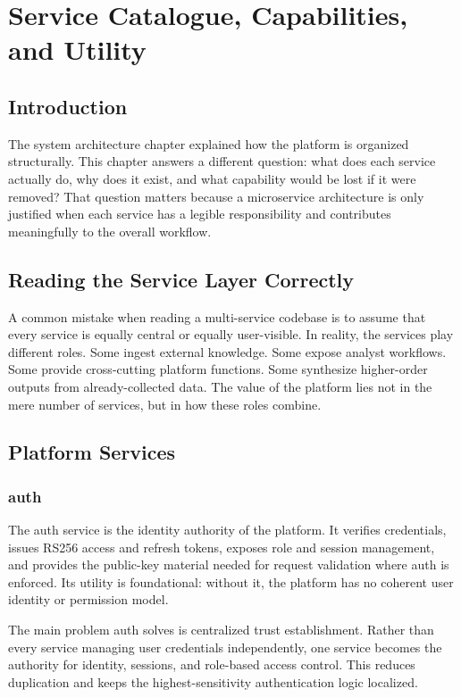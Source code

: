 \chapter{Service Catalogue, Capabilities, and Utility}
\thispagestyle{plain}
\section*{Introduction}
The system architecture chapter explained how the platform is organized structurally. This chapter answers a different question: what does each service actually do, why does it exist, and what capability would be lost if it were removed? That question matters because a microservice architecture is only justified when each service has a legible responsibility and contributes meaningfully to the overall workflow.

\section{Reading the Service Layer Correctly}
A common mistake when reading a multi-service codebase is to assume that every service is equally central or equally user-visible. In reality, the services play different roles. Some ingest external knowledge. Some expose analyst workflows. Some provide cross-cutting platform functions. Some synthesize higher-order outputs from already-collected data. The value of the platform lies not in the mere number of services, but in how these roles combine.

\section{Platform Services}
\subsection{auth}
The auth service is the identity authority of the platform. It verifies credentials, issues RS256 access and refresh tokens, exposes role and session management, and provides the public-key material needed for request validation where auth is enforced. Its utility is foundational: without it, the platform has no coherent user identity or permission model.

The main problem auth solves is centralized trust establishment. Rather than every service managing user credentials independently, one service becomes the authority for identity, sessions, and role-based access control. This reduces duplication and keeps the highest-sensitivity authentication logic localized.

